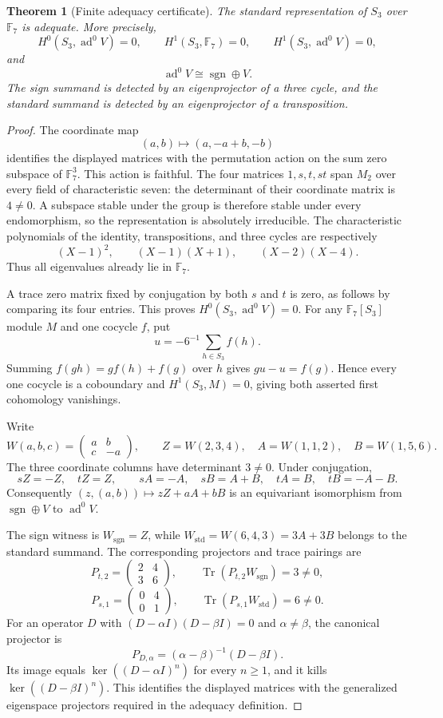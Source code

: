 \documentclass[11pt]{amsart}
\newtheorem{theorem}{Theorem}[section]
\theoremstyle{definition}
\theoremstyle{remark}
\newcommand{\FF}{\mathbb F}
\newcommand{\Tr}{\operatorname{Tr}}
\newcommand{\ad}{\operatorname{ad}}
\begin{document}
\begin{theorem}[Finite adequacy certificate]\label{thm:s3_adequacy}
The standard representation of \(S_3\) over \(\FF_7\) is adequate. More precisely,
\[
H^0(S_3,\ad^0V)=0,
\qquad
H^1(S_3,\FF_7)=0,
\qquad
H^1(S_3,\ad^0V)=0,
\]
and
\[
\ad^0V\cong\operatorname{sgn}\oplus V.
\]
The sign summand is detected by an eigenprojector of a three cycle, and the standard summand is detected by an eigenprojector of a transposition.
\end{theorem}

\begin{proof}
The coordinate map
\[
(a,b)\longmapsto(a,-a+b,-b)
\]
identifies the displayed matrices with the permutation action on the sum zero subspace of \(\FF_7^3\). This action is faithful. The four matrices \(1,s,t,st\) span \(M_2\) over every field of characteristic seven: the determinant of their coordinate matrix is \(4\ne0\). A subspace stable under the group is therefore stable under every endomorphism, so the representation is absolutely irreducible. The characteristic polynomials of the identity, transpositions, and three cycles are respectively
\[
(X-1)^2,\qquad (X-1)(X+1),\qquad (X-2)(X-4).
\]
Thus all eigenvalues already lie in \(\FF_7\).

A trace zero matrix fixed by conjugation by both \(s\) and \(t\) is zero, as follows by comparing its four entries. This proves \(H^0(S_3,\ad^0V)=0\). For any \(\FF_7[S_3]\) module \(M\) and one cocycle \(f\), put
\[
u=-6^{-1}\sum_{h\in S_3}f(h).
\]
Summing \(f(gh)=g f(h)+f(g)\) over \(h\) gives \(gu-u=f(g)\). Hence every one cocycle is a coboundary and \(H^1(S_3,M)=0\), giving both asserted first cohomology vanishings.

Write
\[
W(a,b,c)=\begin{pmatrix}a&b\\c&-a\end{pmatrix},
\qquad
Z=W(2,3,4),\quad A=W(1,1,2),\quad B=W(1,5,6).
\]
The three coordinate columns have determinant \(3\ne0\). Under conjugation,
\[
sZ=-Z,\quad tZ=Z,\qquad
sA=-A,\quad sB=A+B,\quad tA=B,\quad tB=-A-B.
\]
Consequently \((z,(a,b))\mapsto zZ+aA+bB\) is an equivariant isomorphism from \(\operatorname{sgn}\oplus V\) to \(\ad^0V\).

The sign witness is \(W_{\mathrm{sgn}}=Z\), while
\(W_{\mathrm{std}}=W(6,4,3)=3A+3B\) belongs to the standard summand. The corresponding projectors and trace pairings are
\[
P_{t,2}=\begin{pmatrix}2&4\\3&6\end{pmatrix},
\qquad \Tr(P_{t,2}W_{\mathrm{sgn}})=3\ne0,
\]
\[
P_{s,1}=\begin{pmatrix}0&4\\0&1\end{pmatrix},
\qquad \Tr(P_{s,1}W_{\mathrm{std}})=6\ne0.
\]
For an operator \(D\) with \((D-\alpha I)(D-\beta I)=0\) and \(\alpha\ne\beta\), the canonical projector is
\[
P_{D,\alpha}=(\alpha-\beta)^{-1}(D-\beta I).
\]
Its image equals \(\ker((D-\alpha I)^n)\) for every \(n\ge1\), and it kills \(\ker((D-\beta I)^n)\). This identifies the displayed matrices with the generalized eigenspace projectors required in the adequacy definition.


\end{proof}
\end{document}
